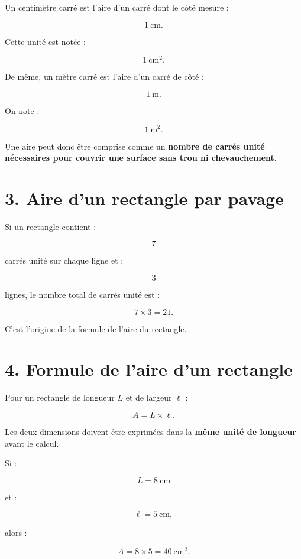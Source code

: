 Un centimètre carré est l’aire d’un carré dont le côté mesure :

\[
1\ \text{cm}.
\]

Cette unité est notée :

\[
1\ \text{cm}^2.
\]

De même, un mètre carré est l’aire d’un carré de côté :

\[
1\ \text{m}.
\]

On note :

\[
1\ \text{m}^2.
\]

Une aire peut donc être comprise comme un \textbf{nombre de carrés unité nécessaires pour couvrir une surface sans trou ni chevauchement}.

\section{3. Aire d’un rectangle par pavage}


Si un rectangle contient :

\[
7
\]

carrés unité sur chaque ligne et :

\[
3
\]

lignes, le nombre total de carrés unité est :

\[
7\times3=21.
\]

C’est l’origine de la formule de l’aire du rectangle.

\section{4. Formule de l’aire d’un rectangle}

Pour un rectangle de longueur $L$ et de largeur $\ell$ :

\[
\boxed{A=L\times\ell}.
\]

Les deux dimensions doivent être exprimées dans la \textbf{même unité de longueur} avant le calcul.

Si :

\[
L=8\ \text{cm}
\]

et :

\[
\ell=5\ \text{cm},
\]

alors :

\[
A=8\times5=40\ \text{cm}^2.
\]

